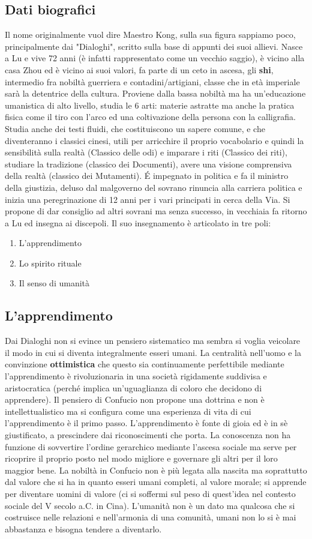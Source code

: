 \documentclass[10pt,a4paper]{report}
\begin{document}
\subsection{Dati biografici}
Il nome originalmente vuol dire Maestro Kong, sulla sua figura sappiamo poco, principalmente dai "Dialoghi", scritto sulla base di appunti dei suoi allievi. Nasce a Lu e vive 72 anni (è infatti rappresentato come un vecchio saggio), è vicino alla casa Zhou ed è vicino ai suoi valori, fa parte di un ceto in ascesa, gli \textbf{shi}, intermedio fra nobiltà guerriera e contadini/artigiani, classe che in età imperiale sarà la detentrice della cultura. Proviene dalla bassa nobiltà ma ha un'educazione umanistica di alto livello, studia le 6 arti:  materie astratte ma anche la pratica fisica come il tiro con l'arco ed una coltivazione della persona con la calligrafia. Studia anche dei testi fluidi, che costituiscono un sapere comune, e che diventeranno i classici cinesi, utili per arricchire il proprio vocabolario e quindi la sensibilità sulla realtà (Classico delle odi) e imparare i riti (Classico dei riti), studiare la tradizione (classico dei Documenti), avere una visione comprensiva della realtà (classico dei Mutamenti). \'E impegnato in politica e fa il ministro della giustizia, deluso dal malgoverno del sovrano rinuncia alla carriera politica e inizia una peregrinazione di 12 anni per i vari principati in cerca della Via. Si propone di dar consiglio ad altri sovrani ma senza successo, in vecchiaia fa ritorno a Lu ed insegna ai discepoli. 
Il suo insegnamento è articolato in tre poli:
\begin{enumerate}
	\item L'apprendimento
	\item Lo spirito rituale
	\item Il senso di umanità
\end{enumerate}
\subsection{L'apprendimento}
 Dai Dialoghi non si evince un pensiero sistematico ma sembra si voglia veicolare il modo in cui si diventa integralmente esseri umani. La centralità nell'uomo e la convinzione \textbf{ottimistica} che questo sia continuamente perfettibile mediante l'apprendimento è rivoluzionaria in una società rigidamente suddivisa e aristocratica (perché implica un'uguaglianza di coloro che decidono di apprendere). Il pensiero di Confucio non propone una dottrina e non è intellettualistico ma si configura come una esperienza di vita di cui l'apprendimento è il primo passo. L'apprendimento è fonte di gioia ed è in sè giustificato, a prescindere dai riconoscimenti che porta. La conoscenza non ha funzione di sovvertire l'ordine gerarchico mediante l'ascesa sociale ma serve per ricoprire il proprio posto nel modo migliore e governare gli altri per il loro maggior bene. La nobiltà in Confucio non è più legata alla nascita ma soprattutto dal valore che si ha in quanto esseri umani completi, al valore morale; si apprende per diventare uomini di valore (ci si soffermi sul peso di quest'idea nel contesto sociale del V secolo a.C. in Cina). L'umanità non è un dato ma qualcosa che si costruisce nelle relazioni e nell'armonia di una comunità, umani non lo si è mai abbastanza e bisogna tendere a diventarlo. 
\end{document}
